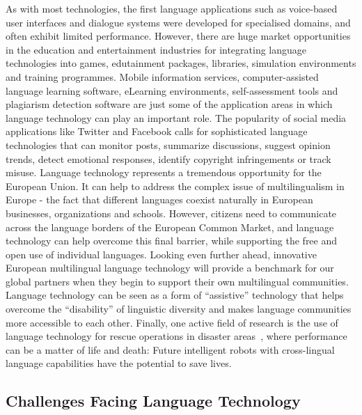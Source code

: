 \begin{multicols}{2}
As with most technologies, the first language applications such as voice-based user interfaces and dialogue systems were developed for specialised domains, and often exhibit limited performance. However, there are huge market opportunities in the education and entertainment industries for integrating language technologies into games, edutainment packages, libraries, simulation environments and training programmes. Mobile information services, computer-assisted language learning software, eLearning environments, self-assessment tools and plagiarism detection software are just some of the application areas in which language technology can play an important role. The popularity of social media applications like Twitter and Facebook calls for sophisticated language technologies that can monitor posts, summarize discussions, suggest opinion trends, detect emotional responses, identify copyright infringements or track misuse.
Language technology represents a tremendous opportunity for the European Union. It can help to address the complex issue of multilingualism in Europe - the fact that different languages coexist naturally in European businesses, organizations and schools. However, citizens need to communicate across the language borders of the European Common Market, and language technology can help overcome this final barrier, while supporting the free and open use of individual languages. Looking even further ahead, innovative European multilingual language technology will provide a benchmark for our global partners when they begin to support their own multilingual communities. Language technology can be seen as a form of ``assistive'' technology that helps overcome the ``disability'' of linguistic diversity and makes language communities more accessible to each other. Finally, one active field of research is the use of language technology for rescue operations in disaster areas~\cite{resnick2011}, where performance can be a matter of life and death: Future intelligent robots with cross-lingual language capabilities have the potential to save lives.

\subsection{Challenges Facing Language Technology}


\end{multicols}
